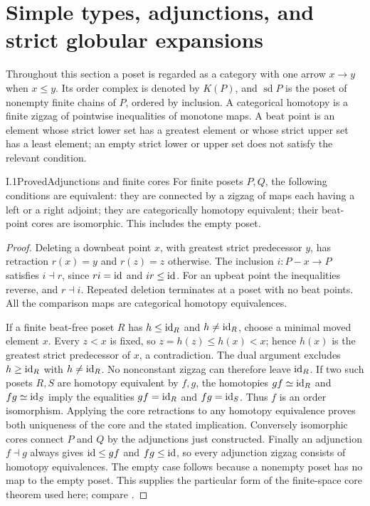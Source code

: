 \section{Simple types, adjunctions, and strict globular expansions}
\label{sec:I}
\providecommand{\sd}{\operatorname{sd}}
\providecommand{\Core}{\operatorname{core}}
\providecommand{\Pos}{\mathrm{Pos}}
\providecommand{\Sf}{\mathcal F}
Throughout this section a poset is regarded as a category with one arrow
$x\to y$ when $x\leq y$. Its order complex is denoted by $K(P)$, and
$\sd P$ is the poset of nonempty finite chains of $P$, ordered by inclusion.
A categorical homotopy is a finite zigzag of pointwise inequalities of
monotone maps. A beat point is an element whose strict lower set has a
greatest element or whose strict upper set has a least element; an empty
strict lower or upper set does not satisfy the relevant condition.

\begin{claim}{I.1}{Proved}{Adjunctions and finite cores}
For finite posets $P,Q$, the following conditions are equivalent: they are
connected by a zigzag of maps each having a left or a right adjoint; they
are categorically homotopy equivalent; their beat-point cores are
isomorphic. This includes the empty poset.
\end{claim}
\begin{proof}
Deleting a downbeat point $x$, with greatest strict predecessor $y$, has
retraction $r(x)=y$ and $r(z)=z$ otherwise. The inclusion $i:P-x\to P$
satisfies $i\dashv r$, since $ri=\mathrm{id}$ and $ir\leq\mathrm{id}$. For an upbeat
point the inequalities reverse, and $r\dashv i$. Repeated deletion
terminates at a poset with no beat points. All the comparison maps are
categorical homotopy equivalences.

If a finite beat-free poset $R$ has $h\leq\mathrm{id}_R$ and $h\neq\mathrm{id}_R$,
choose a minimal moved element $x$. Every $z<x$ is fixed, so
$z=h(z)\leq h(x)<x$; hence $h(x)$ is the greatest strict predecessor of
$x$, a contradiction. The dual argument excludes $h\geq\mathrm{id}_R$ with
$h\neq\mathrm{id}_R$. No nonconstant zigzag can therefore leave $\mathrm{id}_R$.
If two such posets $R,S$ are homotopy equivalent by $f,g$, the homotopies
$gf\simeq\mathrm{id}_R$ and $fg\simeq\mathrm{id}_S$ imply the equalities $gf=\mathrm{id}_R$
and $fg=\mathrm{id}_S$. Thus $f$ is an order isomorphism. Applying the core
retractions to any homotopy equivalence proves both uniqueness of the
core and the stated implication. Conversely isomorphic cores connect
$P$ and $Q$ by the adjunctions just constructed. Finally an adjunction
$f\dashv g$ always gives $\mathrm{id}\leq gf$ and $fg\leq\mathrm{id}$, so every
adjunction zigzag consists of homotopy equivalences. The empty case
follows because a nonempty poset has no map to the empty poset.
This supplies the particular form of the finite-space core theorem used
here; compare \cite[Section~2]{I_BarmakMinian2008}.
\end{proof}

